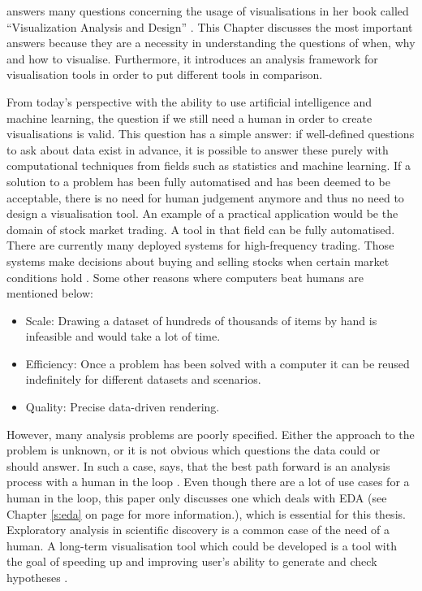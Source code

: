 \citeauthor{Munzner2014} answers many questions concerning the usage of visualisations in her book called ``Visualization Analysis and Design'' . This Chapter discusses the most important answers because they are a necessity in understanding the questions of when, why and how to visualise. Furthermore, it introduces an analysis framework for visualisation tools in order to
put different tools in comparison.

From today's perspective with the ability to use artificial intelligence and machine learning, the question if we still need a human in order to create visualisations is valid. This question has a simple answer: if well-defined questions to ask about data exist in advance, it is possible to answer these purely with computational techniques from fields such as statistics and machine learning. If a solution to a problem has been fully automatised and has been deemed to be acceptable, there is no need for human judgement anymore and thus no need to design a visualisation tool. An example of a practical application would be the domain of stock market trading. A tool in that field can be fully automatised. There are currently many deployed systems for high-frequency trading. Those systems make decisions about buying and selling stocks when certain market conditions hold . Some other reasons where computers beat humans are mentioned below:
\newpage
\begin{itemize}
\item Scale: Drawing a dataset of hundreds of thousands of items by hand is infeasible and would take a lot of time.
\item Efficiency: Once a problem has been solved with a computer it can be reused  indefinitely for different datasets and scenarios.
\item Quality: Precise data-driven rendering.
\end{itemize}
However, many analysis problems are poorly specified. Either the approach to the problem is unknown, or it is not obvious which questions the data could or should answer. In such a case, \citeauthor{Munzner2014} says, that the best path forward is an analysis process with a human in the loop . Even though there are a lot of use cases for a human in the loop, this paper only discusses one which deals with \ac{EDA} (see Chapter \ref{s:eda} on page \pageref{s:eda} for more information.), which is essential for this thesis. Exploratory analysis in scientific discovery is a common case of the need of a human. A long-term visualisation tool which could be developed is a tool with the goal of speeding up and improving user's ability to generate and check hypotheses .

